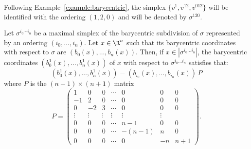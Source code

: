 \begin{example}
Following Example~\ref{example:barycentric}, the simplex $\{
v^1,v^{12},v^{012} 
\}$ will be identified with
the ordering $(1,2,0)$ and will be denoted by $\sigma^{120}$.
\end{example}

\begin{lemma}\label{lem:P}
Let $\sigma^{i_0\cdots i_n}$ be a maximal simplex of the barycentric subdivision of 
 $\sigma$  represented by an ordering $(i_0,\dots,i_n)$.
 Let $x \in \R^n$ such that its barycentric coordinates with respect to $\sigma$ are $(b_0(x), \dots, b_n(x))$.
 Then, 
 if $x\in |\sigma^{i_0\dots i_n}|$,
 the barycentric coordinates
 $(b^1_0(x),\dots,b^1_{n}(x))$ of $x$ with respect to $\sigma^{i_0\dots i_n}$ satisfies that:
 $$(b^1_0(x),\dots,b^1_n(x)) = (b_{i_0}(x), \dots, b_{i_n}(x)) \, P$$
where $P$ is the $(n+1)\times (n+1)$ matrix
$$
P =
\begin{pmatrix}
 1  &  0 &  0 & \cdots  & 0 & 0 & 0   \\
 -1 &  2 &  0 & \cdots  & 0 & 0 & 0   \\
 0  & -2 &  3 & \cdots  & 0 & 0 & 0   \\
\vdots & \vdots   & \vdots & \vdots         &\vdots          & \vdots \\
 0  &  0 & 0  & \cdots  &  n-1        & 0 & 0   \\
 0  &  0 & 0  & \cdots  & - (n-1)              &  n        & 0  \\
 0  &  0 & 0  & \cdots   & 0              & -n              & n+1
\end{pmatrix}.$$
\end{lemma}

